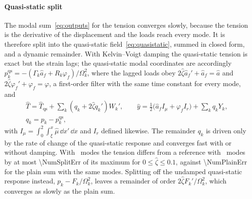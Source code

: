 \paragraph{Quasi-static split} The modal sum~\eqref{eq:outputs} for the tension
converges slowly, because the tension is the derivative of the displacement and the
loads reach every mode. It is therefore split into the quasi-static
field~\eqref{eq:quasistatic}, summed in closed form, and a dynamic remainder. With
Kelvin--Voigt damping the quasi-static tension is exact but the strain lags; the
quasi-static modal coordinates are accordingly
$p_k^{\mathrm{qs}}=-(\Gamma_k\hat a_f+R_k\varphi_f)/\Omega_k^2$, where the lagged loads
obey $2\hat\zeta\hat a_f'+\hat a_f=\hat a$ and $2\hat\zeta\varphi_f'+\varphi_f=\varphi$,
a first-order filter with the same time constant for every mode, and
\begin{equation}\label{eq:split}
\begin{gathered}
  \hat T=\hat T_{\mathrm{qs}}+\sum_k\left(q_k+2\hat\zeta q_k'\right)W_k',\qquad
  \hat y=\tfrac12\bigl(\hat a_fI_\mu+\varphi_fI_r\bigr)+\sum_kq_kY_k,\\
  q_k=p_k-p_k^{\mathrm{qs}},
\end{gathered}
\end{equation}
with $I_\mu=\int_0^2\int_\xi^x\hat\mu\,\dd x'\,\dd x$ and $I_r$ defined likewise. The
remainder $q_k$ is driven only by the rate of change of the quasi-static response and
converges fast with or without damping. With \NumSplitModes\ modes the tension differs
from a reference with \NumSplitRefModes\ modes by at most \num{\NumSplitErr} of its
maximum for $0\le\hat\zeta\le0.1$, against \num{\NumPlainErr} for the plain sum with the
same modes. Splitting off the undamped quasi-static response instead, $p_k-F_k/\Omega_k^2$,
leaves a remainder of order $2\hat\zeta F_k'/\Omega_k^2$, which converges as slowly as
the plain sum.

